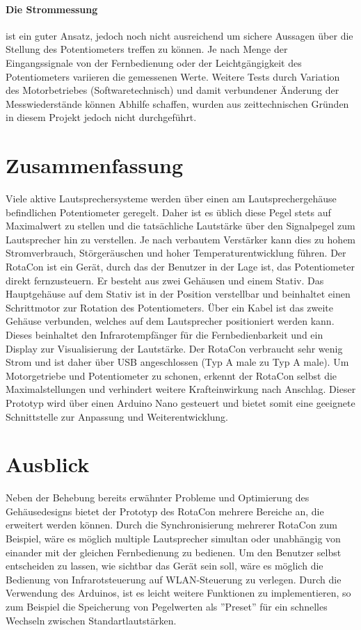 \documentclass[11pt, titlepage, fleqn]{report}
\begin{document}
			\paragraph{Die Strommessung}
			ist ein guter Ansatz, jedoch noch nicht ausreichend um sichere Aussagen über die Stellung des Potentiometers treffen zu können. Je nach Menge der Eingangssignale von der Fernbedienung oder der Leichtgängigkeit des Potentiometers variieren die gemessenen Werte. Weitere Tests durch Variation des Motorbetriebes (Softwaretechnisch) und damit verbundener Änderung der Messwiederstände können Abhilfe schaffen, wurden aus zeittechnischen Gründen in diesem Projekt jedoch nicht durchgeführt.

		\section{Zusammenfassung}
			Viele aktive Lautsprechersysteme werden über einen am Lautsprechergehäuse befindlichen Potentiometer geregelt. Daher ist es üblich diese Pegel stets auf Maximalwert zu stellen und die tatsächliche Lautstärke über den Signalpegel zum Lautsprecher hin zu verstellen. Je nach verbautem Verstärker kann dies zu hohem Stromverbrauch, Störgeräuschen und hoher Temperaturentwicklung führen. Der RotaCon ist ein Gerät, durch das der Benutzer in der Lage ist, das Potentiometer direkt fernzusteuern. Er besteht aus zwei Gehäusen und einem Stativ. Das Hauptgehäuse auf dem Stativ ist in der Position verstellbar und beinhaltet einen Schrittmotor zur Rotation des Potentiometers. Über ein Kabel ist das zweite Gehäuse verbunden, welches auf dem Lautsprecher positioniert werden kann. Dieses beinhaltet den Infrarotempfänger für die Fernbedienbarkeit und ein Display zur Visualisierung der Lautstärke. Der RotaCon verbraucht sehr wenig Strom und ist daher über USB angeschlossen (Typ A male zu Typ A male). Um Motorgetriebe und Potentiometer zu schonen, erkennt der RotaCon selbst die Maximalstellungen und verhindert weitere Krafteinwirkung nach Anschlag. Dieser Prototyp wird über einen Arduino Nano gesteuert und bietet somit eine geeignete Schnittstelle zur Anpassung und Weiterentwicklung.
		\section{Ausblick}
			Neben der Behebung bereits erwähnter Probleme und Optimierung des Gehäusedesigns bietet der Prototyp des RotaCon mehrere Bereiche an, die erweitert werden können. Durch die Synchronisierung mehrerer RotaCon zum Beispiel, wäre es möglich multiple Lautsprecher simultan oder unabhängig von einander mit der gleichen Fernbedienung zu bedienen. Um den Benutzer selbst entscheiden zu lassen, wie sichtbar das Gerät sein soll, wäre es möglich die Bedienung von Infrarotsteuerung auf WLAN-Steuerung zu verlegen. Durch die Verwendung des Arduinos, ist es leicht weitere Funktionen zu implementieren, so zum Beispiel die Speicherung von Pegelwerten als ''Preset'' für ein schnelles Wechseln zwischen Standartlautstärken.
\end{document}
